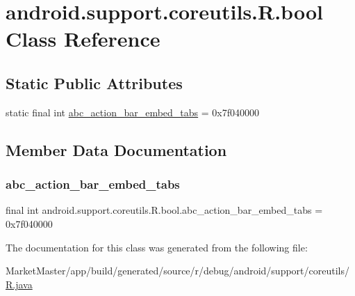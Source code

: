 \hypertarget{classandroid_1_1support_1_1coreutils_1_1R_1_1bool}{}\section{android.\+support.\+coreutils.\+R.\+bool Class Reference}
\label{classandroid_1_1support_1_1coreutils_1_1R_1_1bool}
\subsection*{Static Public Attributes}
\begin{DoxyCompactItemize}
\item 
static final int \mbox{\hyperlink{classandroid_1_1support_1_1coreutils_1_1R_1_1bool_a823fbd5acb99b42be3b1595abf7aeadb}{abc\+\_\+action\+\_\+bar\+\_\+embed\+\_\+tabs}} = 0x7f040000
\end{DoxyCompactItemize}


\subsection{Member Data Documentation}
\mbox{\label{classandroid_1_1support_1_1coreutils_1_1R_1_1bool_a823fbd5acb99b42be3b1595abf7aeadb}} 
\subsubsection{\texorpdfstring{abc\+\_\+action\+\_\+bar\+\_\+embed\+\_\+tabs}{abc\_action\_bar\_embed\_tabs}}
{\footnotesize\ttfamily final int android.\+support.\+coreutils.\+R.\+bool.\+abc\+\_\+action\+\_\+bar\+\_\+embed\+\_\+tabs = 0x7f040000\hspace{0.3cm}{\ttfamily [static]}}



The documentation for this class was generated from the following file\+:\begin{DoxyCompactItemize}
\item 
Market\+Master/app/build/generated/source/r/debug/android/support/coreutils/\mbox{\hyperlink{debug_2android_2support_2coreutils_2R_8java}{R.\+java}}\end{DoxyCompactItemize}
